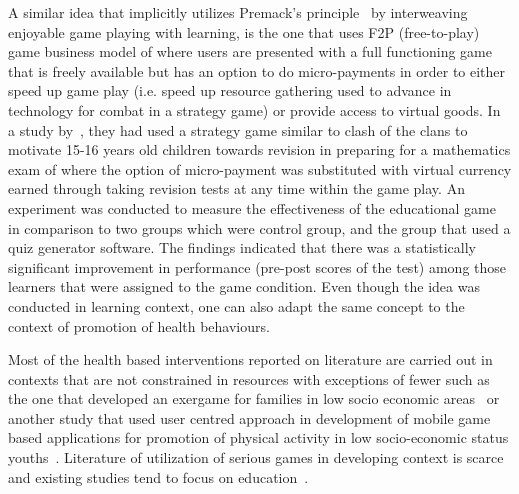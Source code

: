 A similar idea that implicitly utilizes Premack's principle~\citep{premack1959toward} by interweaving enjoyable  game  playing  with  learning, is the one that uses F2P (free-to-play) game business model of where users are presented with a full functioning game that is freely available but has an option to do micro-payments in order to either speed up game play (i.e. speed up resource gathering used to advance in technology for combat in a strategy game) or provide access to virtual goods. In a study by~\cite{preist2015use}, they had used a strategy game similar to clash of the clans to motivate 15-16 years old children towards revision in preparing for a mathematics exam of where the option of micro-payment was substituted with virtual currency earned through taking revision tests at any time within the game play. An experiment was conducted to measure the effectiveness of the educational game in comparison to two groups which were control group, and the group that used a quiz generator software. The findings indicated that there was a statistically significant improvement in performance (pre-post scores of the test) among those learners that were assigned to the game condition. Even though the idea was conducted in learning context, one can also adapt the same concept to the context of promotion of health behaviours.

Most of the health based interventions reported on literature are carried out in contexts that are not constrained in resources with exceptions of fewer such as the one that developed an exergame for families in low socio economic areas~\citep{saksono2015spaceship} or another study that used user centred approach in development of mobile game based applications for promotion of physical activity in low socio-economic status youths~\citep{blackman2016developing}. Literature of utilization of serious games in developing context is scarce and existing studies tend to focus on education~\citep{kam2008designing,botha2015icts}.

